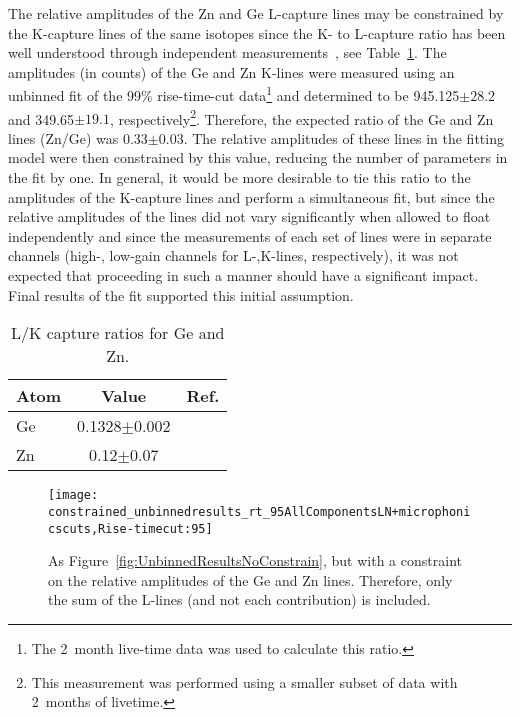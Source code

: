 The relative amplitudes of the Zn and Ge L-capture lines may be constrained by the K-capture lines of the same isotopes since the K- to L-capture ratio has been well understood through independent measurements~\cite{Bea67,Ocampo1962}, see Table~\ref{tab:LKRatios}.  The amplitudes (in counts) of the Ge and Zn K-lines were measured using an unbinned fit of the 99\% rise-time-cut data\footnote{The 2~month live-time data was used to calculate this ratio.} and determined to be 945.125$\pm28.2$ and 349.65$\pm19.1$, respectively\footnote{This measurement was performed using a smaller subset of data with 2~months of livetime.}.  Therefore, the expected ratio of the Ge and Zn lines (Zn/Ge) was 0.33$\pm$0.03.  The relative amplitudes of these lines in the fitting model were then constrained by this value, reducing the number of parameters in the fit by one.  In general, it would be more desirable to tie this ratio to the amplitudes of the K-capture lines and perform a simultaneous fit, but since the relative amplitudes of the lines did not vary significantly when allowed to float independently and since the measurements of each set of lines were in separate channels (high-, low-gain channels for L-,K-lines, respectively), it was not expected that proceeding in such a manner should have a significant impact.  Final results of the fit supported this initial assumption.
	
			\begin{table}
				\centering
				\begin{tabular}{lcr}
					\toprule
					Atom & Value & Ref.\\
					\midrule
					Ge & 0.1328$\pm$0.002 & \cite{Bea67}\\
					Zn & 0.12$\pm$0.07 & \cite{Ocampo1962}\\
					\bottomrule
				\end{tabular}	
				\caption[L/K capture ratios for Ge and Zn]
				{L/K capture ratios for Ge and Zn.}
				\label{tab:LKRatios}
			\end{table}
			
			\begin{figure}
				\centering				
				\texttt{[image: constrained\_unbinnedresults\_rt\_95AllComponentsLN+microphonicscuts,Rise-timecut:95]}				
				\caption[Results from an unbinned fit, constraints on relative amplitude of Ge and Zn lines]
				{As Figure~\ref{fig:UnbinnedResultsNoConstrain}, but with a constraint on the relative amplitudes 
				of the Ge and Zn lines.  Therefore, only the sum of the L-lines (and not each contribution) is included.  }
				\label{fig:UnBinnedResultsConstrain}
			\end{figure}
					

